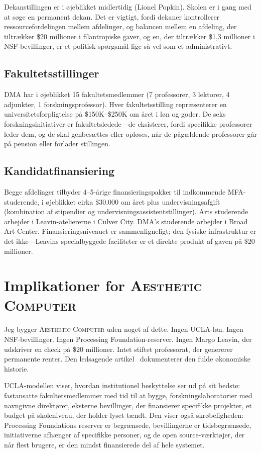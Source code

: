 \documentclass[10pt,letterpaper,twocolumn]{article}
\newcommand{\ac}{\textsc{Aesthetic Computer}}
\newcommand{\dma}{\textsc{DMA}}
\begin{document}
Dekanstillingen er i øjeblikket midlertidig (Lionel Popkin). Skolen er i gang med at søge en permanent dekan. Det er vigtigt, fordi dekaner kontrollerer ressourcefordelingen mellem afdelinger, og balancen mellem en afdeling, der tiltrækker \$20 millioner i filantropiske gaver, og en, der tiltrækker \$1,3 millioner i NSF-bevillinger, er et politisk spørgsmål lige så vel som et administrativt.

\subsection{Fakultetsstillinger}

\dma{} har i øjeblikket 15 fakultetsmedlemmer (7 professorer, 3 lektorer, 4 adjunkter, 1 forskningsprofessor). Hver fakultetsstilling repræsenterer en universitetsforpligtelse på \$150K--\$250K om året i løn og goder. De seks forskningsinitiativer er fakultetsledede---de eksisterer, fordi specifikke professorer leder dem, og de skal genbesættes eller opløses, når de pågældende professorer går på pension eller forlader stillingen.

\subsection{Kandidatfinansiering}

Begge afdelinger tilbyder 4--5-årige finansieringspakker til indkommende MFA-studerende, i øjeblikket cirka \$30.000 om året plus undervisningsafgift (kombination af stipendier og undervisningsassistentstillinger). Arts studerende arbejder i Leavin-ateliererne i Culver City. \dma{}'s studerende arbejder i Broad Art Center. Finansieringsniveauet er sammenligneligt; den fysiske infrastruktur er det ikke---Leavins specialbyggede faciliteter er et direkte produkt af gaven på \$20 millioner.

\section{Implikationer for \ac{}}

Jeg bygger \ac{} uden noget af dette. Ingen UCLA-løn. Ingen NSF-bevillinger. Ingen Processing Foundation-reserver. Ingen Margo Leavin, der udskriver en check på \$20 millioner. Intet stiftet professorat, der genererer permanente renter. Den ledsagende artikel~\citep{scudder2026sustainability} dokumenterer den fulde økonomiske historie.

UCLA-modellen viser, hvordan institutionel beskyttelse ser ud på sit bedste: fastansatte fakultetsmedlemmer med tid til at bygge, forskningslaboratorier med navngivne direktører, eksterne bevillinger, der finansierer specifikke projekter, et budget på skoleniveau, der holder lyset tændt. Den viser også skrøbeligheden: Processing Foundations reserver er begrænsede, bevillingerne er tidsbegrænsede, initiativerne afhænger af specifikke personer, og de open source-værktøjer, der når flest brugere, er den mindst finansierede del af hele systemet.
\end{document}
